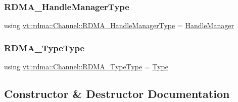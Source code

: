 \subsubsection{\texorpdfstring{R\+D\+M\+A\+\_\+\+Handle\+Manager\+Type}{RDMA\_HandleManagerType}}
{\footnotesize\ttfamily using \hyperlink{structvt_1_1rdma_1_1_channel_ad558d07a917519f3e713fc41496a5ef7}{vt\+::rdma\+::\+Channel\+::\+R\+D\+M\+A\+\_\+\+Handle\+Manager\+Type} =  \hyperlink{structvt_1_1rdma_1_1_handle_manager}{Handle\+Manager}}

\mbox{\label{structvt_1_1rdma_1_1_channel_aaf1a80b6dd527e4876de77bcd58a7330}} 
\subsubsection{\texorpdfstring{R\+D\+M\+A\+\_\+\+Type\+Type}{RDMA\_TypeType}}
{\footnotesize\ttfamily using \hyperlink{namespacevt_1_1rdma_ac848e1d9da43db6294bd06f83e5d3946}{vt\+::rdma\+::\+Channel\+::\+R\+D\+M\+A\+\_\+\+Type\+Type} =  \hyperlink{namespacevt_1_1rdma_ac848e1d9da43db6294bd06f83e5d3946}{Type}}



\subsection{Constructor \& Destructor Documentation}
\mbox{\label{structvt_1_1rdma_1_1_channel_ae15a5cd0e393f64192675d5a33796523}} 
